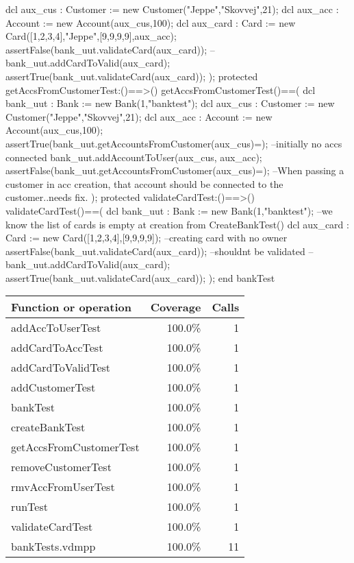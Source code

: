 \documentclass[a4paper]{article}
\begin{document}
\begin{vdm_al}
        dcl aux_cus : Customer := new Customer("Jeppe","Skovvej",21);
        dcl aux_acc : Account := new Account(aux_cus,100);
        dcl aux_card : Card := new Card([1,2,3,4],"Jeppe",[9,9,9,9],aux_acc);
        assertFalse(bank_uut.validateCard(aux_card));
        --
        bank_uut.addCardToValid(aux_card);
        assertTrue(bank_uut.validateCard(aux_card));
    );
    protected getAccsFromCustomerTest:()==>()
    getAccsFromCustomerTest()==(
        dcl bank_uut : Bank := new Bank(1,"banktest");
        dcl aux_cus : Customer := new Customer("Jeppe","Skovvej",21);
        dcl aux_acc : Account := new Account(aux_cus,100);
        assertTrue(bank_uut.getAccountsFromCustomer(aux_cus)={}); --initially no accs connected
        bank_uut.addAccountToUser(aux_cus, aux_acc);
        assertFalse(bank_uut.getAccountsFromCustomer(aux_cus)={});
        --When passing a customer in acc creation, that account should be connected to the customer..needs fix.
    );
    protected validateCardTest:()==>()
    validateCardTest()==(
        dcl bank_uut : Bank := new Bank(1,"banktest");
        --we know the list of cards is empty at creation from CreateBankTest()
        dcl aux_card : Card := new Card([1,2,3,4],[9,9,9,9]); --creating card with no owner
        assertFalse(bank_uut.validateCard(aux_card)); --shouldnt be validated
        --
        bank_uut.addCardToValid(aux_card);
        assertTrue(bank_uut.validateCard(aux_card));
    ); 
end bankTest
\end{vdm_al}
\bigskip
\begin{longtable}{|l|r|r|}
\hline
Function or operation & Coverage & Calls \\
\hline
\hline
addAccToUserTest & 100.0\% & 1 \\
\hline
addCardToAccTest & 100.0\% & 1 \\
\hline
addCardToValidTest & 100.0\% & 1 \\
\hline
addCustomerTest & 100.0\% & 1 \\
\hline
bankTest & 100.0\% & 1 \\
\hline
createBankTest & 100.0\% & 1 \\
\hline
getAccsFromCustomerTest & 100.0\% & 1 \\
\hline
removeCustomerTest & 100.0\% & 1 \\
\hline
rmvAccFromUserTest & 100.0\% & 1 \\
\hline
runTest & 100.0\% & 1 \\
\hline
validateCardTest & 100.0\% & 1 \\
\hline
\hline
bankTests.vdmpp & 100.0\% & 11 \\
\hline
\end{longtable}
\end{document}
